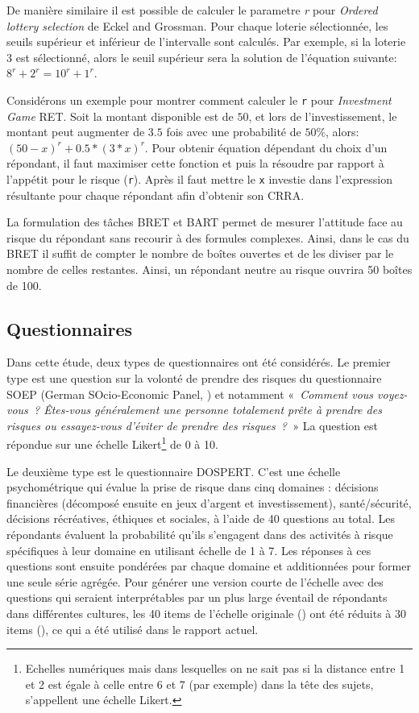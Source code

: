 \documentclass[12pt]{article}
\begin{document}
De manière similaire il est possible de calculer le parametre \emph{r}
pour \emph{Ordered lottery selection} de Eckel and Grossman. Pour chaque
loterie sélectionnée, les seuils supérieur et inférieur de l'intervalle
sont calculés. Par exemple, si la loterie 3 est sélectionné, alors le
seuil supérieur sera la solution de l'équation suivante:
\(8^r + 2^r = 10^r + 1^r\).

Considérons un exemple pour montrer comment calculer le \texttt{r} pour
\emph{Investment Game} RET. Soit la montant disponible est de \(50\), et
lors de l'investissement, le montant peut augmenter de \(3.5\) fois avec
une probabilité de \(50\)\%, alors: \((50 - x)^r + 0.5 * (3 * x)^r\).
Pour obtenir équation dépendant du choix d'un répondant, il faut
maximiser cette fonction et puis la résoudre par rapport à l'appétit
pour le risque (\texttt{r}). Après il faut mettre le \texttt{x} investie
dans l'expression résultante pour chaque répondant afin d'obtenir son
CRRA.

La formulation des tâches BRET et BART permet de mesurer l'attitude face
au risque du répondant sans recourir à des formules complexes. Ainsi,
dans le cas du BRET il suffit de compter le nombre de boîtes ouvertes et
de les diviser par le nombre de celles restantes. Ainsi, un répondant
neutre au risque ouvrira 50 boîtes de 100.

\subsection{Questionnaires}

Dans cette étude, deux types de questionnaires ont été considérés. Le
premier type est une question sur la volonté de prendre des risques du
questionnaire SOEP (German SOcio-Economic Panel, \citet{SOEP2007}) et
notamment «~\emph{Comment vous voyez-vous~? Êtes-vous généralement une
personne totalement prête à prendre des risques ou essayez-vous d'éviter
de prendre des risques~?~}» La question est répondue sur une échelle
Likert\footnote{Echelles numériques mais dans lesquelles on ne sait pas
  si la distance entre 1 et 2 est égale à celle entre 6 et 7 (par
  exemple) dans la tête des sujets, s'appellent une échelle Likert.} de
0 à 10.

Le deuxième type est le questionnaire DOSPERT. C'est une échelle
psychométrique qui évalue la prise de risque dans cinq domaines :
décisions financières (décomposé ensuite en jeux d'argent et
investissement), santé/sécurité, décisions récréatives, éthiques et
sociales, à l'aide de 40 questions au total. Les répondants évaluent la
probabilité qu'ils s'engagent dans des activités à risque spécifiques à
leur domaine en utilisant échelle de 1 à 7. Les réponses à ces questions
sont ensuite pondérées par chaque domaine et additionnées pour former
une seule série agrégée. Pour générer une version courte de l'échelle
avec des questions qui seraient interprétables par un plus large
éventail de répondants dans différentes cultures, les 40 items de
l'échelle originale (\citet{Weber2002}) ont été réduits à 30 items
(\citet{Blais2006}), ce qui a été utilisé dans le rapport actuel.
\end{document}
